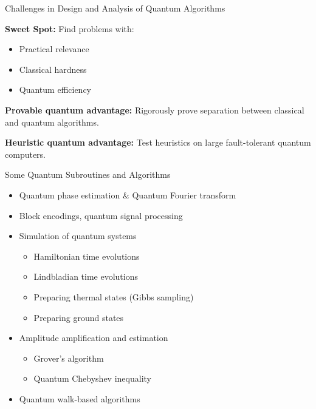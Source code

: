 \documentclass[handout]{beamer} %
\renewcommand{\>}{\rangle}
\newcommand{\<}{\langle}
\theoremstyle{definition}
\begin{document}

\begin{frame}{Challenges in Design and Analysis of Quantum Algorithms}

\textbf{Sweet Spot:}
Find problems with:
\medskip
\begin{itemize}
    \item Practical relevance
    \medskip
    \item Classical hardness
    \medskip
    \item Quantum efficiency
\end{itemize}

\bigskip
\textbf{Provable quantum advantage:}
Rigorously prove separation between classical and quantum algorithms.

\bigskip
\textbf{Heuristic quantum advantage:}
Test heuristics on large fault-tolerant quantum computers.

\end{frame}


\begin{frame}{Some Quantum Subroutines and Algorithms}
\begin{itemize}
    \item Quantum phase estimation \& Quantum Fourier transform
    \medskip
    \item Block encodings, quantum signal processing
    \medskip
    \item Simulation of quantum systems
    \begin{itemize}
        \item Hamiltonian time evolutions
        \item Lindbladian time evolutions
        \item Preparing thermal states (Gibbs sampling)
        \item Preparing ground states
    \end{itemize}
    \medskip
    \item Amplitude amplification and estimation
    \begin{itemize}
        \item Grover's algorithm
        \item Quantum Chebyshev inequality
    \end{itemize}
    \medskip
    \item Quantum walk-based algorithms
\end{itemize}
\end{frame}
\end{document}
